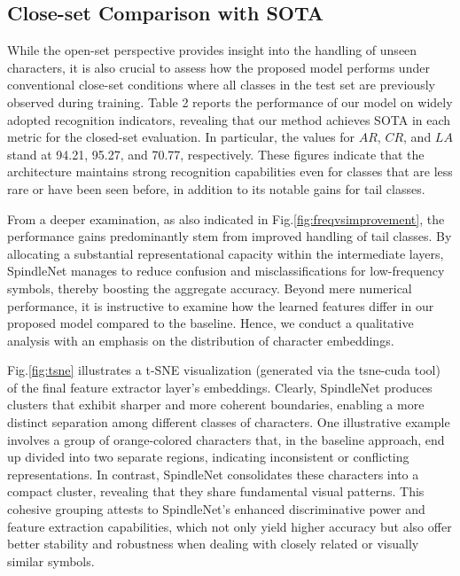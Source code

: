 \subsection{Close-set Comparison with SOTA}
  
\noindent While the open-set perspective provides insight into the handling of unseen characters, it is also crucial to assess how the proposed model performs under conventional close-set conditions where all classes in the test set are previously observed during training. Table 2 reports the performance of our model on widely adopted recognition indicators, revealing that our method achieves SOTA in each metric for the closed-set evaluation. In particular, the values for $AR$, $CR$, and $LA$ stand at 94.21, 95.27, and 70.77, respectively. These figures indicate that the architecture maintains strong recognition capabilities even for classes that are less rare or have been seen before, in addition to its notable gains for tail classes.

From a deeper examination, as also indicated in Fig.\ref{fig:freqvsimprovement}, the performance gains predominantly stem from improved handling of tail classes. By allocating a substantial representational capacity within the intermediate layers, SpindleNet manages to reduce confusion and misclassifications for low-frequency symbols, thereby boosting the aggregate accuracy. Beyond mere numerical performance, it is instructive to examine how the learned features differ in our proposed model compared to the baseline. Hence, we conduct a qualitative analysis with an emphasis on the distribution of character embeddings.

 
Fig.\ref{fig:tsne} illustrates a t-SNE visualization (generated via the tsne-cuda tool) of the final feature extractor layer’s embeddings. Clearly, SpindleNet produces clusters that exhibit sharper and more coherent boundaries, enabling a more distinct separation among different classes of characters. One illustrative example involves a group of orange-colored characters that, in the baseline approach, end up divided into two separate regions, indicating inconsistent or conflicting representations. In contrast, SpindleNet consolidates these characters into a compact cluster, revealing that they share fundamental visual patterns. This cohesive grouping attests to SpindleNet’s enhanced discriminative power and feature extraction capabilities, which not only yield higher accuracy but also offer better stability and robustness when dealing with closely related or visually similar symbols.



